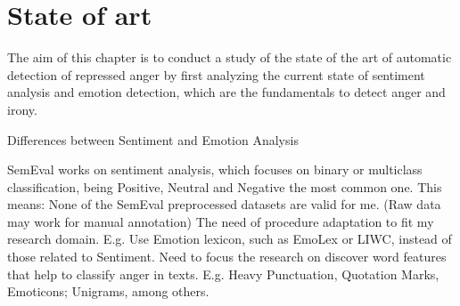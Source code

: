 \chapter{State of art}

The aim of this chapter is to conduct a study of the state of the art of automatic detection of repressed anger by first analyzing the current state of sentiment analysis and emotion detection, which are the fundamentals to detect anger and irony.





Differences between Sentiment and Emotion Analysis

SemEval works on sentiment analysis, which focuses on binary or multiclass classification, being Positive, Neutral and Negative the most common one.
This means:
 None of the SemEval preprocessed datasets are valid for me. (Raw data may work for manual annotation)
 The need of procedure adaptation to fit my research domain.
E.g. Use Emotion lexicon, such as EmoLex or LIWC, instead of  those related to Sentiment.
Need to focus the research on discover word features that help to classify anger in texts.
E.g. Heavy Punctuation, Quotation Marks, Emoticons; Unigrams, among others.

